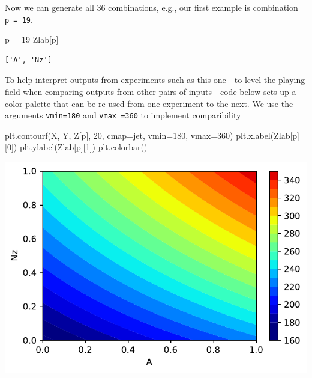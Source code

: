 \documentclass[
  letterpaper,
  DIV=11,
  numbers=noendperiod]{scrreprt}
\newenvironment{Shaded}{\begin{snugshade}}{\end{snugshade}}
\newcommand{\DecValTok}[1]{\textcolor[rgb]{0.68,0.00,0.00}{#1}}
\newcommand{\NormalTok}[1]{\textcolor[rgb]{0.00,0.23,0.31}{#1}}
\newcommand{\OperatorTok}[1]{\textcolor[rgb]{0.37,0.37,0.37}{#1}}
\newcommand{\StringTok}[1]{\textcolor[rgb]{0.13,0.47,0.30}{#1}}
\begin{document}
Now we can generate all 36 combinations, e.g., our first example is
combination \texttt{p\ =\ 19}.

\begin{Shaded}
\begin{Highlighting}[]
\NormalTok{p }\OperatorTok{=} \DecValTok{19}
\NormalTok{Zlab[p]}
\end{Highlighting}
\end{Shaded}

\begin{verbatim}
['A', 'Nz']
\end{verbatim}

To help interpret outputs from experiments such as this one---to level
the playing field when comparing outputs from other pairs of
inputs---code below sets up a color palette that can be re-used from one
experiment to the next. We use the arguments \texttt{vmin=180} and
\texttt{vmax\ =360} to implement comparibility

\begin{Shaded}
\begin{Highlighting}[]
\NormalTok{plt.contourf(X, Y, Z[p], }\DecValTok{20}\NormalTok{, cmap}\OperatorTok{=}\StringTok{\textquotesingle{}jet\textquotesingle{}}\NormalTok{, vmin}\OperatorTok{=}\DecValTok{180}\NormalTok{, vmax}\OperatorTok{=}\DecValTok{360}\NormalTok{)}
\NormalTok{plt.xlabel(Zlab[p][}\DecValTok{0}\NormalTok{])}
\NormalTok{plt.ylabel(Zlab[p][}\DecValTok{1}\NormalTok{])}
\NormalTok{plt.colorbar()}
\end{Highlighting}
\end{Shaded}

\includegraphics{002_awwe_files/figure-pdf/cell-11-output-1.pdf}
\end{document}
